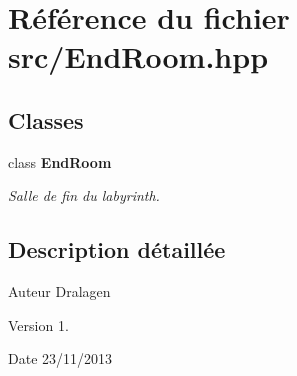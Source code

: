 \section{Référence du fichier src/\-End\-Room.hpp}
\label{_end_room_8hpp}
\subsection*{Classes}
\begin{DoxyCompactItemize}
\item 
class {\bf End\-Room}
\begin{DoxyCompactList}\small\item\em Salle de fin du labyrinth. \end{DoxyCompactList}\end{DoxyCompactItemize}


\subsection{Description détaillée}
\begin{DoxyAuthor}{Auteur}
Dralagen 
\end{DoxyAuthor}
\begin{DoxyVersion}{Version}
1. 
\end{DoxyVersion}
\begin{DoxyDate}{Date}
23/11/2013 
\end{DoxyDate}
